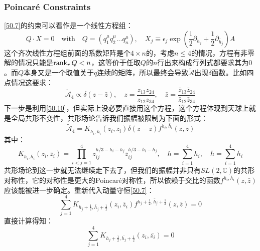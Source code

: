 \subsubsection{Poincar\'e Constraints}
\ref{50.7}的约束可以看作是一个线性方程组：
\begin{equation}
	Q\cdot X=0\quad\text{with}\quad Q=(q_1^\mu q_2^\mu...q_n^\mu),\quad X_j\equiv\epsilon_j\exp(\frac12\partial_{h_j}+\frac12\partial_{\bar{h}_j})A
\end{equation}
这个齐次线性方程组前面的系数矩阵是个$4\times n$的，考虑$n\leq 4$的情况，方程有非零解的情况只能是$\rank_r Q<n$，这等价于任取$Q$的$n$行出来构成行列式都要求其为$0$。而$Q$本身又是一个取值关于$q$连续的矩阵，所以最终会导致$\tilde{\mathcal{A}}$出现$\delta$函数。比如四点情况这要求：
\begin{equation}
	\widetilde{\mathcal{A}}_4\propto\delta(z-\bar{z}),\quad z=\frac{z_{13}z_{24}}{z_{12}z_{34}},\quad\bar{z}=\frac{\bar{z}_{13}\bar{z}_{24}}{\bar{z}_{12}\bar{z}_{34}}
\end{equation}
下一步是利用\ref{50.10}，但实际上没必要直接用这个方程，这个方程体现到天球上就是全局共形不变性，共形场论告诉我们振幅被限制为下面的形式：
\begin{equation}
	\widetilde{\mathcal{A}}_4=K_{h_i,\bar{h}_i}(z_i,\bar{z}_i)\delta(z-\bar{z})f^{h_i,\bar{h}_i}(z,\bar{z})
\end{equation}
其中：
\begin{equation}
	K_{h_i,\bar{h}_i}(z_i,\bar{z}_i)=\prod_{i<j=1}^4z_{ij}^{h/3-h_i-h_j}\bar{z}_{ij}^{\bar{h}/3-\bar{h}_i-\bar{h}_j},\quad h=\sum_{i=1}^4h_i,\quad\bar{h}=\sum_{i=1}^4\bar{h}_i
\end{equation}
共形场论到这一步就无法继续走下去了，但我们的振幅并非只有$SL(2,\mathbb{C})$的共形对称性，它的对称性是更大的Poincar\'e对称性，所以依赖于交比的函数$f^{h_i,\bar{h}_i}(z,\bar{z})$应该能被进一步确定。重新代入动量守恒\ref{50.7}：
\begin{equation}\label{50.22}
	\sum_{j=1}^4K_{h_j+\frac12,\bar{h}_j+\frac12}(z_i,\bar{z}_i)f^{h_j+\frac12,\bar{h}_j+\frac12}(z,\bar{z})=0
\end{equation}
直接计算得知：
\begin{equation}
	\sum_{j=1}^4K_{h_j+\frac12,\bar{h_j}+\frac12}(z_i,\bar{z_i})=0
\end{equation}
